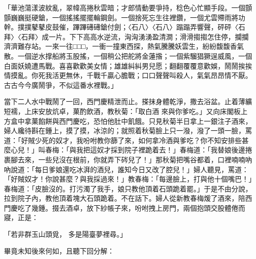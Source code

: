 「華池蕩漾波紋亂，翠幃高捲秋雲暗；才郎情動要爭持，稔色心忙顯手段。一個顫顫巍巍挺硬鎗，一個搖搖擺擺輪鋼劍。一個捨死忘生往裡鑽，一個尤雲殢雨將功幹。撲撲鼕鼕皮鼓催，蹕蹕礡礡鎗付劍；〈石八〉〈石八〉蹋蹋弄響聲，砰砰〈石拜〉〈石拜〉成一片。下下高高水逆流，洶洶湧湧盈清澗；滑滑搊搊怎住停，攔攔濟濟難存站。一來一往□□□，一衝一撞東西探，熱氣騰騰妖雲生，紛紛馥馥香氣散。一個逆水撑船將玉股搖，一個稍公把舵將金蓮揝；一個紫騮猖獗逞威風，一個白面妖嬈遭馬戰。喜喜歡歡美女情；雄雄糾糾男兒愿；翻翻覆覆意歡娛，鬧鬧挨挨情摸亂。你死我活更無休，千戰千贏心膽戰；口口聲聲叫殺人，氣氣昂昂情不厭。古古今今廣鬧爭，不似這番水裡戰。」

當下二人水中戰鬧了一回，西門慶精泄而止。搽抹身體乾淨，撒去浴盆。止着薄纊短襦，上床安放炕卓，菓酌飲酒，教秋菊：「取白酒 來與你爹吃。」又向床閣板上方盒中拿菓餡餅與西門慶吃，恐怕他肚中飢餓。只見秋菊半日拿上一銀注子酒來，婦人纔待斟在鍾上，摸了摸，冰涼的；就照着秋菊臉上只一潑，潑了一頭一臉，罵道：「好賊少死的奴才，我吩咐教你篩了來，如何拿冷酒與爹吃？你不知安排些甚麼心兒！」叫春梅：「與我把這奴才採到院子裡跪着去！」春梅道：「我替娘後邊捲裹腳去來，一些兒沒在根前，你就弄下硶兒了！」那秋菊把嘴谷都着，口裡喃喃吶吶說道：「每日爹娘還吃冰湃的酒兒，誰知今日又改了腔兒！」婦人聽見，罵道：「好賊奴才！你說甚麼？與我採過來！」教春梅：「每邊臉上，打與他十個嘴巴！」春梅道：「皮臉沒的。打污濁了我手，娘只教他頂着石頭跪着罷。」于是不由分說，拉到院子內，教他頂着塊大石頭跪着。不在話下。婦人從新教春梅煖了酒來，陪西門慶吃了幾鍾。掇去酒卓，放下紗帳子來，吩咐拽上房門，兩個抱頭交股體倦而寢，正是：

「若非群玉山頭覓，  多是陽臺夢裡尋。」

畢竟未知後來何如，且聽下回分解：

